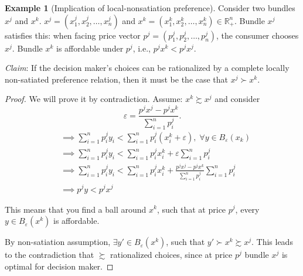 \documentclass[12pt, a4paper]{article}
\theoremstyle{definition}
\newtheorem{example}{Example}
\newcommand{\summation}[2]{\sum\limits_{#1}^{#2}}
\newcommand{\vep}{\varepsilon}
\begin{document}
\begin{example}[Implication of local-nonsatiation preference]
Consider two bundles $x^j$ and $x^k$. $x^j= (x_1^j,x_2^j,\dots,x_n^j)$ and $x^k=(x_1^k,x_2^k,\dots,x_n^k)\in \mathbb{R}_+^n$. Bundle $x^j$ satisfies this: when facing price vector $p^j=(p_1^j,p_2^j,\dots,p_n^j)$, the consumer chooses $x^j$. Bundle $x^k$ is affordable under $p^j$, i.e., $p^jx^k<p^jx^j$. 

\emph{Claim}: If the decision maker's choices can be rationalized by a complete locally non-satiated preference relation, then it must be the case that $x^j\succ x^k$.
\begin{proof}
We will prove it by contradiction. Assume: $x^k\succsim x^j$ and consider 
\[
\vep = \frac{p^jx^j-p^jx^k}{\summation{i=1}{n} p^j_i}.
\]
\begin{align*}
&\implies \summation{i=1}{n}p_i^jy_i <\summation{i=1}{n}p_i^j(x_i^k+\vep),\;\forall y \in B_{\vep}(x_k)\\
&\implies \summation{i=1}{n}p_i^jy_i<\summation{i=1}{n}p_i^jx_i^k+\vep\summation{i=1}{n}p_i^j \\
&\implies \summation{i=1}{n}p_i^jy_i<\summation{i=1}{n}p_i^jx_i^k+\frac{p^jx^j-p^jx^k}{\summation{i=1}{n} p_i^j}\summation{i=1}{n}p^j_i\\
&\implies p^jy<p^jx^j
\end{align*}

This means that you find a ball around $x^k$, such that at price $p^j$, every $y \in B_{\vep}(x^k)$ is affordable.

By non-satiation assumption, $\exists y'\in B_\vep(x^k)$, such that $y'\succ x^k\succsim x^j$. This leads to the contradiction that $\succsim$ rationalized choices, since at price $p^j$ bundle $x^j$ is optimal for decision maker.
\end{proof}
\end{example}
\end{document}

